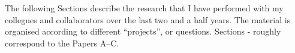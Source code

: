 \documentclass[thesis.tex]{subfiles}
\begin{document}
The following Sections describe the research that I have performed with my collegues and collaborators over the last two and a half years. The material is organised according to different ``projects'', or questions. Sections - roughly correspond to the Papers A--C.
\end{document}
